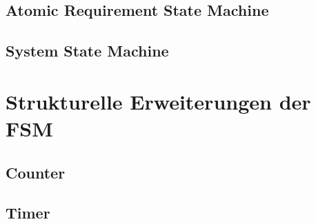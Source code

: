 \subsection{Atomic Requirement State Machine}
\label{subsec:ARSM}
\subsection{System State Machine}
\label{subsec:SSM}
\section{Strukturelle Erweiterungen der FSM}
\label{sec:ext_FSM}
\subsection{Counter}
\label{subsec:ext_FSM_counter}
\subsection{Timer}
\label{subsec:ext_FSM_timer}